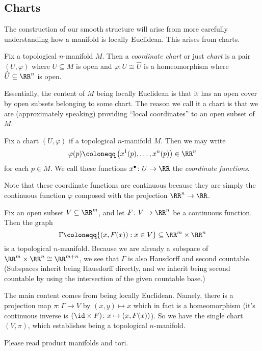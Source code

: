 \documentclass[../notes.tex]{subfiles}
\begin{document}
\subsection{Charts}
The construction of our smooth structure will arise from more carefully understanding how a manifold is locally Euclidean. This arises from charts.
\begin{definition}[chart]
	Fix a topological $n$-manifold $M$. Then a \textit{coordinate chart} or just \textit{chart} is a pair $(U,\varphi)$ where $U\subseteq M$ is open and $\varphi\colon U\cong\widehat U$ is a homeomorphism where $\widehat U\subseteq\RR^n$ is open.
\end{definition}
Essentially, the content of $M$ being locally Euclidean is that it has an open cover by open subsets belonging to some chart. The reason we call it a chart is that we are (approximately speaking) providing ``local coordinates'' to an open subset of $M$.
\begin{definition}
	Fix a chart $(U,\varphi)$ if a topological $n$-manifold $M$. Then we may write
	\[\varphi(p)\coloneqq\left(x^1(p),\ldots,x^n(p)\right)\in\RR^n\]
	for each $p\in M$. We call these functions $x^\bullet\colon U\to\RR$ the \textit{coordinate functions}.
\end{definition}
Note that these coordinate functions are continuous because they are simply the continuous function $\varphi$ composed with the projection $\RR^n\to\RR$.
\begin{example}
	Fix an open subset $V\subseteq\RR^m$, and let $F\colon V\to\RR^n$ be a continuous function. Then the graph
	\[\Gamma\coloneqq\{(x,F(x)):x\in V\}\subseteq\RR^m\times\RR^n\]
	is a topological $n$-manifold. Because we are already a subspace of $\RR^m\times\RR^n\cong\RR^{m+n}$, we see that $\Gamma$ is also Hausdorff and second countable. (Subspaces inherit being Hausdorff directly, and we inherit being second countable by using the intersection of the given countable base.)
	
	The main content comes from being locally Euclidean. Namely, there is a projection map $\pi\colon\Gamma\to V$ by $(x,y)\mapsto x$ which in fact is a homeomorphism (it's continuous inverse is $({\id}\times F)\colon x\mapsto(x,F(x))$). So we have the single chart $(V,\pi)$, which establishes being a topological $n$-manifold.
\end{example}
\begin{remark}
	Please read product manifolds and tori.
\end{remark}
\end{document}
